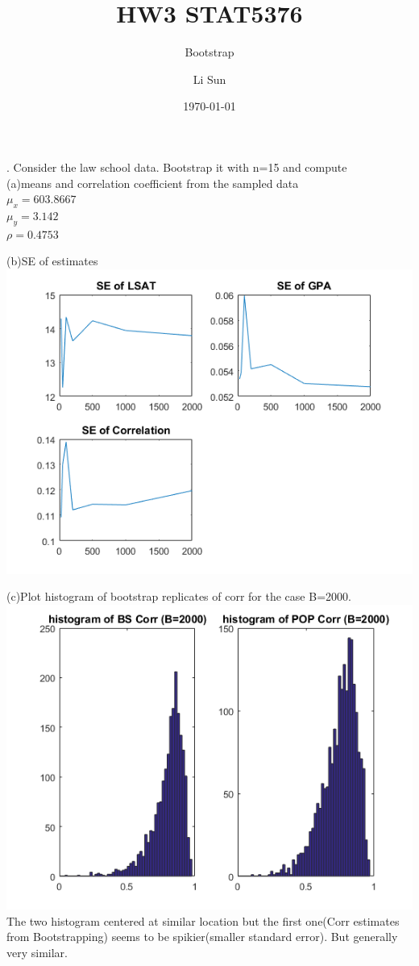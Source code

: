 \documentclass[11pt]{scrartcl}
\begin{document}
\title{HW3 STAT5376}
\subtitle{Bootstrap}
\author{Li Sun}
\date{\today}
\maketitle

. Consider the law school data. Bootstrap it with n=15 and compute\\
(a)means and correlation coefficient from the sampled data\\
$\mu_x=603.8667$\\
$\mu_y=3.142$\\
$\rho=0.4753$\\
\medskip

(b)SE of estimates\\
\includegraphics[scale=1]{hw31b.png}\\
\medskip

(c)Plot histogram of bootstrap replicates of corr for the case B=2000.\\
\includegraphics[scale=1]{hw31c.png}\\
The two histogram centered at similar location but the first one(Corr estimates from Bootstrapping) seems to be spikier(smaller standard error). But generally very similar.\\
\bigskip
\end{document}
